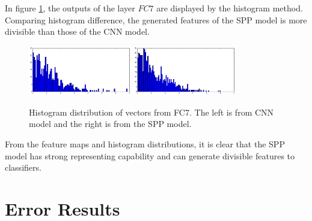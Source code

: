 In figure \ref{fig:fc7_hist_output}, the outputs of the layer $FC7$ are displayed by the histogram method. Comparing histogram difference, the generated features of the SPP model is more divisible than those of the CNN model.
\begin{figure}[htb]
    \centering
	\includegraphics[width=0.4\textwidth]{sunny2_hist_caffe_fc7.png}
	\includegraphics[width=0.4\textwidth]{sunny2_hist_spp_fc7.png}
    \caption{Histogram distribution of vectors from FC7. The left is from CNN model and the right is from the SPP model.}%
    \label{fig:fc7_hist_output}%
\end{figure}

From the feature maps and histogram distributions, it is clear that the SPP model has strong representing capability and can generate divisible features to classifiers.

\section{Error Results}


